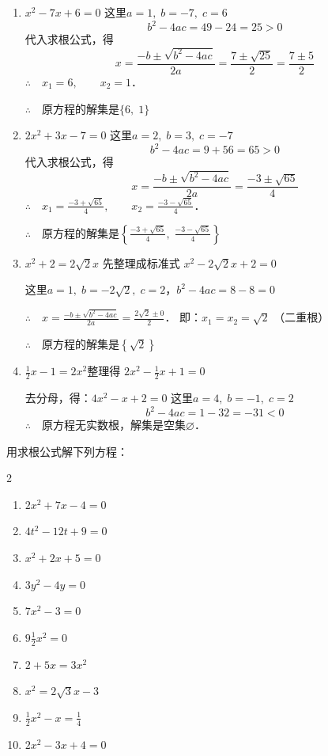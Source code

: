 \begin{solution}
\begin{enumerate}
    \item  $x^2-7x+6=0$ 这里$a=1,\; b=-7,\; c=6$
\[b^2-4ac=49-24=25>0\]
代入求根公式，得
\[x=\frac{-b\pm\sqrt{b^2-4ac}}{2a}=\frac{7\pm\sqrt{25}}{2}=\frac{7\pm 5}{2} \]
$\therefore\quad x_1=6,\qquad x_2=1$．

$\therefore\quad $原方程的解集是$\{6,\; 1\}$

\item $2x^2+3x-7=0$ 这里$a=2,\; b=3,\; c=-7$
\[b^2-4ac=9+56=65>0\]
代入求根公式，得
\[x=\frac{-b\pm\sqrt{b^2-4ac}}{2a}=\frac{-3\pm\sqrt{65}}{4} \]
$\therefore\quad x_1=\frac{-3+\sqrt{65}}{4},\qquad x_2=\frac{-3-\sqrt{65}}{4}$．

$\therefore\quad $原方程的解集是$\left\{\frac{-3+\sqrt{65}}{4},\; \frac{-3-\sqrt{65}}{4}\right\}$

\item $x^2+2=2\sqrt{2}x$ 先整理成标准式 $x^2-2\sqrt{2}x+2=0$

这里$a=1,\; b=-2\sqrt{2},\; c=2$，$b^2-4ac=8-8=0$

$\therefore\quad x=\frac{-b\pm\sqrt{b^2-4ac}}{2a}=\frac{2\sqrt{2}\pm 0}{2}$．
即：$x_1=x_2=\sqrt{2}$ （二重根）

$\therefore\quad $原方程的解集是$\left\{\sqrt{2}\right\}$

\item $\frac{1}{2}x-1=2x^2$整理得  $2x^2-\frac{1}{2}x+1=0$

去分母，得：$4x^2-x+2=0$ 这里$a=4,\; b=-1,\; c=2$
\[b^2-4ac=1-32=-31<0\]
$\therefore\quad $原方程无实数根，解集是空集$\varnothing$．
\end{enumerate}    
\end{solution}

\begin{ex}
    用求根公式解下列方程：
    \begin{multicols}{2}
 \begin{enumerate}
    \item $2 x^{2}+7 x-4=0$
\item $4 t^{2}-12 t+9=0$
\item $x^{2}+2 x+5=0$
\item  $3 y^{2}-4 y=0$
\item  $7 x^{2}-3=0$
\item $9 \frac{1}{2} x^{2}=0$
\item  $2+5 x=3 x^{2}$
\item  $x^{2}=2 \sqrt{3} x-3$
\item  $\frac{1}{2} x^{2}-x=\frac{1}{4}$
\item $2 x^{2}-3 x+4=0$
\end{enumerate}       
    \end{multicols}

\end{ex}



